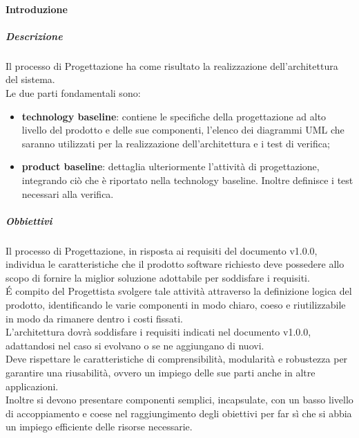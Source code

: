             \paragraph{Introduzione}
                \subparagraph{Descrizione}
                    Il processo di Progettazione ha come risultato la realizzazione dell’architettura del sistema.\\
                    Le due parti fondamentali sono:\\
                    \begin{itemize}
                        \item\textbf{technology baseline}: contiene le specifiche della progettazione ad alto livello del prodotto e delle sue componenti, l'elenco dei diagrammi UML che saranno utilizzati per la realizzazione dell'architettura e i test di verifica;
                        \item\textbf{product baseline}: dettaglia ulteriormente l'attività di progettazione, integrando ciò che è riportato nella technology baseline. Inoltre definisce i test necessari alla verifica.
                    \end{itemize}
                \subparagraph{Obbiettivi}
                    Il processo di Progettazione, in risposta ai requisiti del documento  v1.0.0, individua le caratteristiche che il prodotto software richiesto deve possedere allo scopo di fornire la miglior soluzione adottabile per soddisfare i requisiti.\\
                    É compito del Progettista svolgere tale attività attraverso la definizione logica del prodotto, identificando le varie componenti in modo chiaro, coeso e riutilizzabile in modo da rimanere dentro i costi fissati.\\
                    L'architettura dovrà soddisfare i requisiti indicati nel documento  v1.0.0, adattandosi nel caso si evolvano o se ne aggiungano di nuovi. \\
                    Deve rispettare le caratteristiche di comprensibilità, modularità e robustezza per garantire una riusabilità, ovvero un impiego delle sue parti anche in altre applicazioni. \\
                    Inoltre si devono presentare componenti semplici, incapsulate, con un basso livello di accoppiamento e coese nel raggiungimento degli obiettivi per far sì che si abbia un impiego efficiente delle risorse necessarie.\\
                    
